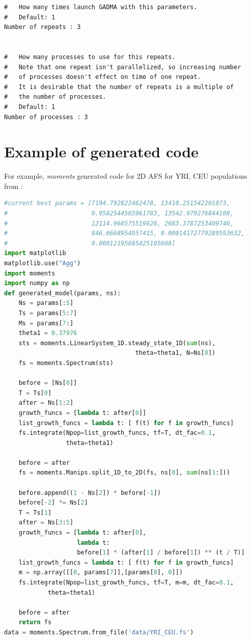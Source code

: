 \documentclass[12pt]{article}
\newcommand{\moments}{\textit{moments}\xspace}
\begin{document}
\begin{appendices}
\begin{lstlisting}
#   How many times launch GADMA with this parameters.
#   Default: 1
Number of repeats : 3


#   How many processes to use for this repeats.
#   Note that one repeat isn't parallelized, so increasing number
#   of processes doesn't effect on time of one repeat.
#   It is desirable that the number of repeats is a multiple of 
#   the number of processes.
#   Default: 1
Number of processes : 3
\end{lstlisting}

\newpage
\section{Example of generated code}
\label{sec:ex-gen-code}
For example, \moments generated code for 2D AFS for YRI, CEU populations from \cite{gutenkunst2009}:

\begin{lstlisting}[language=Python]
#current best params = [7194.792822462478, 13410.251542201073, 
#                       0.9582544565961783, 13542.979276844108, 
#                       12114.968575519626, 2683.3787253409746, 
#                       846.6668954957415, 0.00014172779289593632, 
#                       0.00012195685425105608]
import matplotlib
matplotlib.use("Agg")
import moments
import numpy as np
def generated_model(params, ns):
	Ns = params[:5]
	Ts = params[5:7]
	Ms = params[7:]
	theta1 = 0.37976
	sts = moments.LinearSystem_1D.steady_state_1D(sum(ns), 
	                                theta=theta1, N=Ns[0])
	fs = moments.Spectrum(sts)

	before = [Ns[0]]
	T = Ts[0]
	after = Ns[1:2]
	growth_funcs = [lambda t: after[0]]
	list_growth_funcs = lambda t: [ f(t) for f in growth_funcs]
	fs.integrate(Npop=list_growth_funcs, tf=T, dt_fac=0.1, 
	             theta=theta1)

	before = after
	fs = moments.Manips.split_1D_to_2D(fs, ns[0], sum(ns[1:]))

	before.append((1 - Ns[2]) * before[-1])
	before[-2] *= Ns[2]
	T = Ts[1]
	after = Ns[3:5]
	growth_funcs = [lambda t: after[0], 
	                lambda t: 
	                before[1] * (after[1] / before[1]) ** (t / T)]
	list_growth_funcs = lambda t: [ f(t) for f in growth_funcs]
	m = np.array([[0, params[7]],[params[8], 0]])
	fs.integrate(Npop=list_growth_funcs, tf=T, m=m, dt_fac=0.1,
	        theta=theta1)

	before = after
	return fs
data = moments.Spectrum.from_file('data/YRI_CEU.fs')



\end{lstlisting}
\end{appendices}
\end{document}
